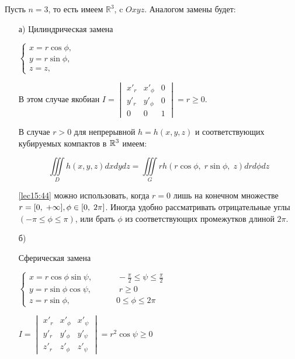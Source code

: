 \documentclass[../../main.tex]{subfiles}
\begin{document}
	\begin{exmp}
		Пусть $ n = 3 $, то есть имеем $ \mathbb{R}^3 $, c  $ Oxyz $. Аналогом замены
		будет:
		\begin{itemize}
			\item[а)]
			Цилиндрическая замена
			
			$\begin{cases}
				x = r \cos{\phi},\\
				y = r \sin{\phi},\\
				z = z,
			\end{cases}$
			
			В этом случае якобиан $I = \begin{vmatrix}
			x'_r & x'_\phi & 0 \\
			y'_r & y'_\phi & 0 \\
			0 & 0 & 1
			\end{vmatrix}=r\geq 0$.
			
			В случае $r > 0$ для непрерывной $h=h(x, y, z)$ и соответствующих
			кубируемых компактов в $\mathbb{R}^3$ имеем:
			
			\begin{equation}
			\label{lec15:44}
			\iiint\limits_{D} h(x, y, z) dx dy dz=
			\iiint\limits_{G} rh(r\cos{\phi},\; r\sin{\phi},\; z) dr d\phi dz
			\end{equation}
			
			\eqref{lec15:44} можно использовать, когда $r=0$ лишь на конечном множестве
			$r = [0,\;+\infty],\\ \phi \in [0,\; 2\pi]$. Иногда удобно рассматривать
			отрицательные углы $(-\pi \leq \phi \leq \pi)$, или брать $\phi$ из
			соответствующих промежутков длиной $2\pi$.
			
			\item[б)]
			
			Сферическая замена 
			
			$\begin{cases}
			x = r \cos{\phi} \sin{\psi},\;\;\;\;\;\;\;\;\;\;\;
			 -\frac{\pi}{2}\leq \psi \leq \frac{\pi}{2}\\
			y = r \sin{\phi} \cos{\psi},\;\;\;\;\;\;\;\;\;\;\;\; r \geq 0\\
			z = r \sin{\phi},\;\;\;\;\;\;\;\;\;\;\;\;\;\;\;\;\;\;\;\; 0 \leq \phi \leq 
			2\pi
			\end{cases}$
			
			 $I = \begin{vmatrix}
				x'_r & x'_\phi & x'_\psi \\
				y'_r & y'_\phi & y'_\psi \\
				z'_r & z'_\phi & z'_\psi
			\end{vmatrix}=r^2\cos{\psi}\geq 0$
			

\end{itemize}
\end{exmp}
\end{document}
